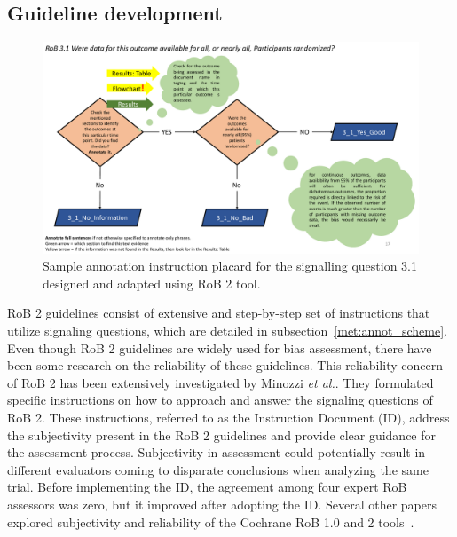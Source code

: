 \documentclass[sn-mathphys,Numbered]{sn-jnl}%
\theoremstyle{thmstyleone}%
\theoremstyle{thmstyletwo}%
\theoremstyle{thmstylethree}%
\begin{document}
\subsection{Guideline development}
\label{guidelines}
%
%
%
%
\begin{figure}
    \centering
    \includegraphics[width=0.80\columnwidth]{figures/placard_3_1.pdf}
    \caption{Sample annotation instruction placard for the signalling question 3.1 designed and adapted using RoB 2 tool.}
    \label{fig:placard}
\end{figure}
%
%
%

RoB 2 guidelines consist of extensive and step-by-step set of instructions that utilize signaling questions, which are detailed in subsection~\ref{met:annot_scheme}.
Even though RoB 2 guidelines are widely used for bias assessment, there have been some research on the reliability of these guidelines.
This reliability concern of RoB 2 has been extensively investigated by Minozzi \textit{et al.}. 
They formulated specific instructions on how to approach and answer the signaling questions of RoB 2.
These instructions, referred to as the Instruction Document (ID), address the subjectivity present in the RoB 2 guidelines and provide clear guidance for the assessment process.
Subjectivity in assessment could potentially result in different evaluators coming to disparate conclusions when analyzing the same trial.
Before implementing the ID, the agreement among four expert RoB assessors was zero, but it improved after adopting the ID.
Several other papers explored subjectivity and reliability of the Cochrane RoB 1.0 and 2 tools~\cite{minozzi2022reliability,da2017effect,loef2022interrater,minozzi2020revised}.
\end{document}
